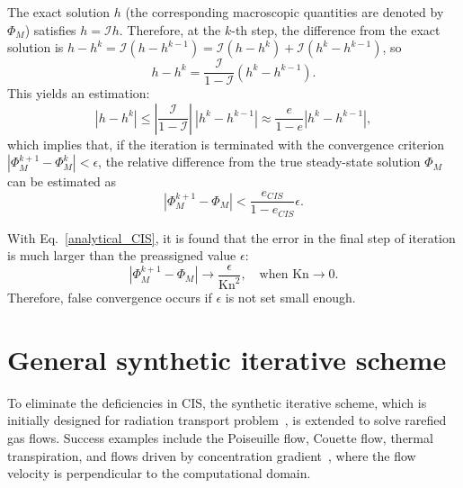 The exact solution $h$ (the corresponding macroscopic quantities are denoted by $\Phi_M$) satisfies $h=\mathcal{I}h$. Therefore, at the $k$-th step, the difference from the exact solution is
$h-h^k=\mathcal{I}(h-h^{k-1})=\mathcal{I}(h-h^{k})+\mathcal{I}(h^k-h^{k-1})$,
so
\begin{equation}
h-h^k=\frac{\mathcal{I}}{1-\mathcal{I}}(h^k-h^{k-1}).
\end{equation}
This yields an estimation:
\begin{equation}
|h-h^k|\le\left|\frac{\mathcal{I}}{1-\mathcal{I}}\right|~ |h^k-h^{k-1}|
\approx \frac{e}{1-e}|h^k-h^{k-1}|,
\end{equation}
which implies that, if the iteration is terminated  with the convergence criterion $|\Phi_M^{k+1}-\Phi_M^{k}|<\epsilon$, the relative difference from the true steady-state solution $\Phi_M$ can be estimated as
\begin{equation}\label{false_convergence2}
|\Phi_M^{k+1}-\Phi_M|<\frac{e_{CIS}}{1-e_{CIS}}\epsilon.
\end{equation}


With Eq.~\eqref{analytical_CIS}, it is found that the error in the final step of iteration is much larger than the preassigned value $\epsilon$:
\begin{equation}\label{false_convergence_CIS}
|\Phi_M^{k+1}-\Phi_M|\rightarrow\frac{\epsilon}{\text{Kn}^2}, \quad \text{when~}\text{Kn}\rightarrow0.
\end{equation}
Therefore, false convergence  occurs if $\epsilon$ is not set small enough. 



\section{General synthetic iterative scheme}

To eliminate the deficiencies in CIS, the synthetic iterative scheme, which is initially designed for radiation transport problem~\cite{DSA2002}, is extended to solve rarefied gas flows. Success examples include the Poiseuille flow, Couette flow, thermal transpiration, and flows driven by concentration gradient~\cite{Valougeorgis:2003zr,Lihnaropoulos2007,SZALMAS20104315,NARIS2004629,NARIS2004294,Naris2005Pof,SZALMAS201691,LeiJCP2017,SU2019573}, where the flow velocity is perpendicular to the computational domain. %


